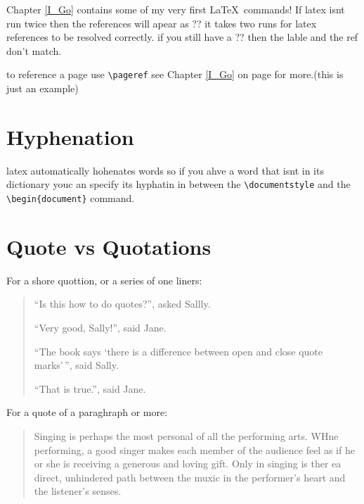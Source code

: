 \documentclass[12pt,twoside,leqno]{article}%
\begin{document}
Chapter \ref{I_Go} contains some of my very first \LaTeX\ commands!
If latex isnt run twice then the references will apear as ?? it takes two runs for latex references to be resolved correctly. if you still have a ?? then the lable and the ref don't match.

to reference a  page use \verb!\pageref!  see Chapter \ref{I_Go} on page \pageref{I_Go} for more.(this is just an example)
\section{Hyphenation}
latex automatically hohenates words so if you ahve a word that isnt in its dictionary youc an specify its hyphatin in between the \verb!\documentstyle! and the
\verb!\begin{document}! command.

\section{Quote vs Quotations}
For a shore quottion, or a series of one liners:

\begin{quote}
``Is this how to do quotes?'', asked Sallly.

``Very good, Sally!'', said Jane.

``The book says `there is a difference between open and close quote marks'\,'', said Sally.

``That is true.'', said Jane.
\end{quote}

For a quote of a paraghraph or more:

\begin{quotation}
Singing is perhaps the most personal of all the performing arts. WHne performing, a good singer makes each member of the audience feel as if he or she is receiving a generous and loving gift. Only in singing is ther ea direct, unhindered path between the muxic in the performer's heart and the listener's senses.
\end{quotation}
\end{document}

